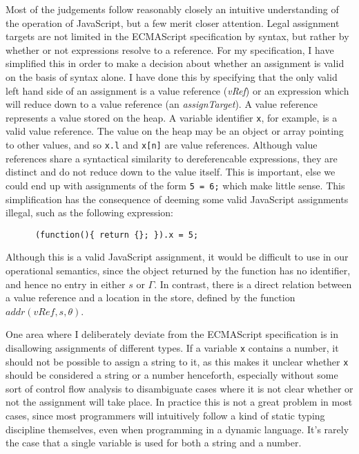 \documentclass[12pt,a4paper,twoside,openright]{report}
\begin{document}
Most of the judgements follow reasonably closely an intuitive understanding of
the operation of JavaScript, but a few merit closer attention. Legal assignment
targets are not limited in the ECMAScript specification by syntax, but rather
by whether or not expressions resolve to a reference. For my specification, I
have simplified this in order to make a decision about whether an assignment is
valid on the basis of syntax alone. I have done this by specifying that the
only valid left hand side of an assignment is a value reference (\textit{vRef})
or an expression which will reduce down to a value reference (an
\textit{assignTarget}). A value reference represents a value stored on the
heap. A variable identifier \texttt{x}, for example, is a valid value
reference. The value on the heap may be an object or array pointing to other
values, and so \texttt{x.l} and \texttt{x[n]} are value references. Although
value references share a syntactical similarity to dereferencable expressions,
they are distinct and do not reduce down to the value itself. This is
important, else we could end up with assignments of the form \texttt{5 = 6;}
which make little sense. This simplification has the consequence of deeming
some valid JavaScript assignments illegal, such as the following expression:
\begin{program}[H]
	\begin{verbatim}
	  (function(){ return {}; }).x = 5;
	\end{verbatim}
\end{program}
Although this is a valid JavaScript assignment, it would be difficult to use in
our operational semantics, since the object returned by the function has no
identifier, and hence no entry in either $s$ or $\Gamma$. In contrast, there is
a direct relation between a value reference and a location in the store,
defined by the function $addr(vRef, s, \theta)$.

One area where I deliberately deviate from the ECMAScript specification is in
disallowing assignments of different types. If a variable \texttt{x} contains a
number, it should not be possible to assign a string to it, as this makes it
unclear whether \texttt{x} should be considered a string or a number
henceforth, especially without some sort of control flow analysis to
disambiguate cases where it is not clear whether or not the assignment will
take place. In practice this is not a great problem in most cases, since most
programmers will intuitively follow a kind of static typing discipline
themselves, even when programming in a dynamic language. It's rarely the case
that a single variable is used for both a string and a number.
\end{document}
